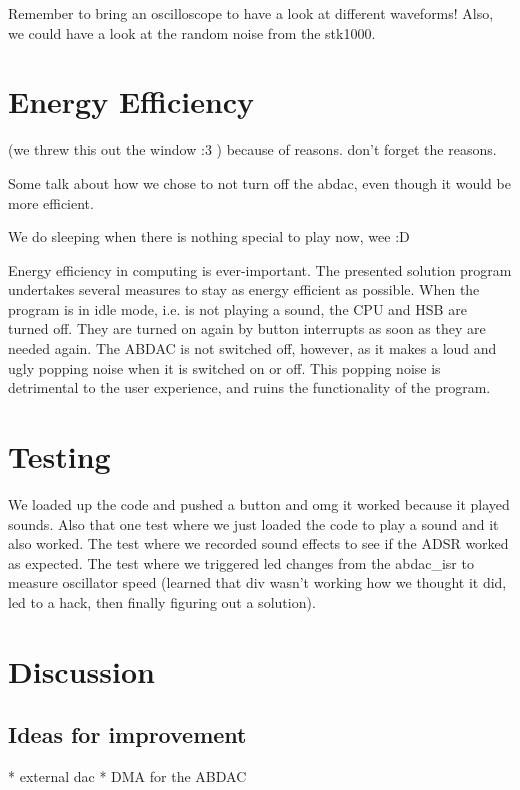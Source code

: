 

Remember to bring an oscilloscope to have a look at different waveforms! Also, we could have a look at the random noise from the stk1000.

\section{Energy Efficiency}

(we threw this out the window :3 )
because of reasons. don't forget the reasons.

Some talk about how we chose to not turn off the abdac, even though it would be more efficient.

We do sleeping when there is nothing special to play now, wee :D


Energy efficiency in computing is ever-important.
The presented solution program undertakes several measures to stay as energy efficient as possible.
When the program is in idle mode, i.e. is not playing a sound, the CPU and HSB are turned off.
They are turned on again by button interrupts as soon as they are needed again.
The ABDAC is not switched off, however, as it makes a loud and ugly popping noise when it is switched on or off.
This popping noise is detrimental to the user experience, and ruins the functionality of the program.


\section{Testing}
We loaded up the code and pushed a button and omg it worked because it played sounds.
Also that one test where we just loaded the code to play a sound and it also worked.
The test where we recorded sound effects to see if the ADSR worked as expected.
The test where we triggered led changes from the abdac_isr to measure oscillator speed (learned that div wasn't working how we thought it did, led to a hack, then finally figuring out a solution).


\section{Discussion}

\subsection{Ideas for improvement}

* external dac
* DMA for the ABDAC

